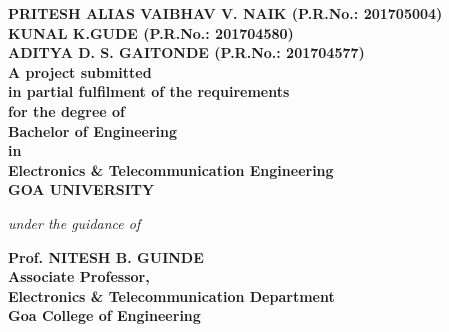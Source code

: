 \begin{center}
\bfseries{PRITESH ALIAS VAIBHAV V. NAIK (P.R.No.: 201705004)\\KUNAL K.GUDE (P.R.No.: 201704580)\\ADITYA D. S. GAITONDE (P.R.No.: 201704577)}\\
\vspace{0.4cm}
A project submitted\\in partial fulfilment of the requirements\\for the degree  of\\Bachelor of Engineering\\in\\Electronics \& Telecommunication Engineering\\GOA UNIVERSITY\\
\vspace{0.4cm}
\begin{small}
\emph{under the guidance of}\\
\end{small}
\vspace{0.5cm}
{\bfseries \large Prof. NITESH B. GUINDE}\\
{\bfseries \large Associate Professor,\\Electronics \& Telecommunication Department\\Goa College of Engineering}\\
\vspace{1cm}
\end{center}
